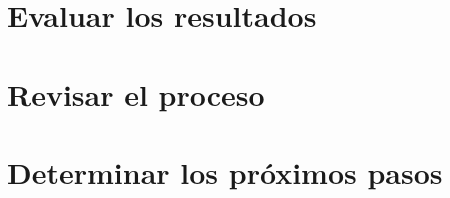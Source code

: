 \documentclass[11pt,letterpaper,DIV=12]{scrartcl}
\begin{document}


\tableofcontents
\clearpage




\section{Evaluar los resultados}




\section{Revisar el proceso}




\section{Determinar los próximos pasos}



\end{document}
